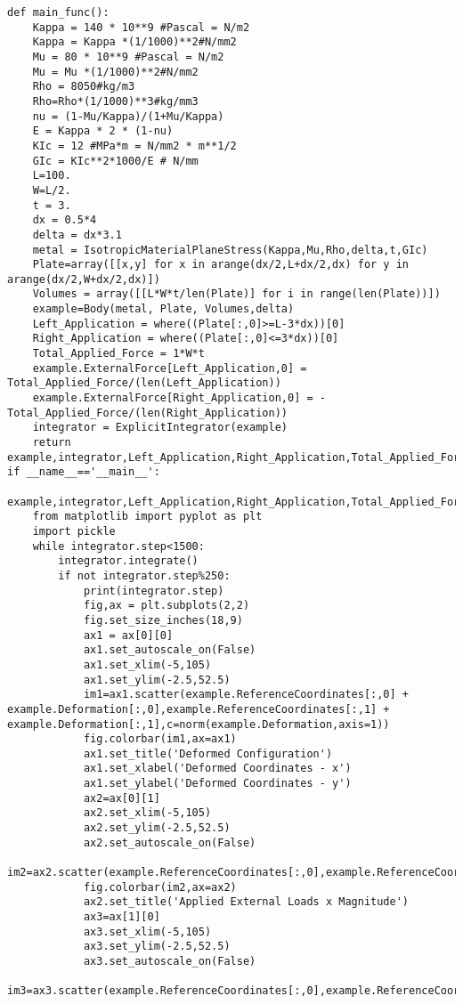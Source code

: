 \documentclass[10pt,a4paper,onecolumn]{article}
\begin{document}
\begin{verbatim}
def main_func():
    Kappa = 140 * 10**9 #Pascal = N/m2
    Kappa = Kappa *(1/1000)**2#N/mm2
    Mu = 80 * 10**9 #Pascal = N/m2
    Mu = Mu *(1/1000)**2#N/mm2
    Rho = 8050#kg/m3
    Rho=Rho*(1/1000)**3#kg/mm3
    nu = (1-Mu/Kappa)/(1+Mu/Kappa)
    E = Kappa * 2 * (1-nu)
    KIc = 12 #MPa*m = N/mm2 * m**1/2
    GIc = KIc**2*1000/E # N/mm
    L=100.
    W=L/2.
    t = 3.
    dx = 0.5*4
    delta = dx*3.1
    metal = IsotropicMaterialPlaneStress(Kappa,Mu,Rho,delta,t,GIc)
    Plate=array([[x,y] for x in arange(dx/2,L+dx/2,dx) for y in arange(dx/2,W+dx/2,dx)])
    Volumes = array([[L*W*t/len(Plate)] for i in range(len(Plate))])
    example=Body(metal, Plate, Volumes,delta)
    Left_Application = where((Plate[:,0]>=L-3*dx))[0]
    Right_Application = where((Plate[:,0]<=3*dx))[0]
    Total_Applied_Force = 1*W*t
    example.ExternalForce[Left_Application,0] = Total_Applied_Force/(len(Left_Application))
    example.ExternalForce[Right_Application,0] = -Total_Applied_Force/(len(Right_Application))
    integrator = ExplicitIntegrator(example)
    return example,integrator,Left_Application,Right_Application,Total_Applied_Force
if __name__=='__main__':
    example,integrator,Left_Application,Right_Application,Total_Applied_Force=main_func()
    from matplotlib import pyplot as plt
    import pickle
    while integrator.step<1500:
        integrator.integrate()
        if not integrator.step%250:
            print(integrator.step)
            fig,ax = plt.subplots(2,2)
            fig.set_size_inches(18,9)
            ax1 = ax[0][0]
            ax1.set_autoscale_on(False)
            ax1.set_xlim(-5,105)
            ax1.set_ylim(-2.5,52.5)
            im1=ax1.scatter(example.ReferenceCoordinates[:,0] + example.Deformation[:,0],example.ReferenceCoordinates[:,1] + example.Deformation[:,1],c=norm(example.Deformation,axis=1))
            fig.colorbar(im1,ax=ax1)
            ax1.set_title('Deformed Configuration')
            ax1.set_xlabel('Deformed Coordinates - x')
            ax1.set_ylabel('Deformed Coordinates - y')
            ax2=ax[0][1]
            ax2.set_xlim(-5,105)
            ax2.set_ylim(-2.5,52.5)
            ax2.set_autoscale_on(False)    
            im2=ax2.scatter(example.ReferenceCoordinates[:,0],example.ReferenceCoordinates[:,1],c=example.ExternalForce[:,0])
            fig.colorbar(im2,ax=ax2)
            ax2.set_title('Applied External Loads x Magnitude')
            ax3=ax[1][0]
            ax3.set_xlim(-5,105)
            ax3.set_ylim(-2.5,52.5)
            ax3.set_autoscale_on(False)
            im3=ax3.scatter(example.ReferenceCoordinates[:,0],example.ReferenceCoordinates[:,1],c=example.InternalForce[:,0])

\end{verbatim}
\end{document}
